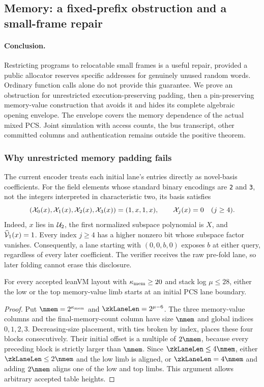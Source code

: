 \subsection{Memory: a fixed-prefix obstruction and a small-frame repair}\label{note:zk-memory-frames}

\paragraph{Conclusion.} Restricting programs to relocatable small frames is a useful repair, provided a public allocator reserves specific addresses for genuinely unused random words. Ordinary function calls alone do not provide this guarantee. We prove an obstruction for unrestricted execution-preserving padding, then a pin-preserving memory-value construction that avoids it and hides its complete algebraic opening envelope. The envelope covers the memory dependence of the actual mixed PCS. Joint simulation with access counts, the bus transcript, other committed columns and authentication remains outside the positive theorem.

\subsubsection{Why unrestricted memory padding fails}

The current encoder treats each initial lane's entries directly as novel-basis coefficients. For the field elements whose standard binary encodings are \texttt{2} and \texttt{3}, not the integers interpreted in characteristic two, its basis satisfies
\[
 (\mathcal{X}_0(x),\mathcal{X}_1(x),\mathcal{X}_2(x),\mathcal{X}_3(x))=(1,x,1,x),
 \qquad \mathcal{X}_j(x)=0\quad(j\ge4).
\]
Indeed, $x$ lies in $\mathcal{U}_2$, the first normalized subspace polynomial is $X$, and $\widehat{\mathcal{V}}_{1}(x)=1$. Every index $j\ge4$ has a higher nonzero bit whose subspace factor vanishes. Consequently, a lane starting with $(0,0,b,0)$ exposes $b$ at either query, regardless of every later coefficient. The verifier receives the raw pre-fold lane, so later folding cannot erase this disclosure.

\begin{proposition}\label{prop:zk-memory-alignment}
For every accepted leanVM layout with $\kappa_{\mathrm{mem}}\ge20$ and stack log $\mu\le28$, either the low or the top memory-value limb starts at an initial PCS lane boundary.
\end{proposition}
\begin{proof}
Put $\nmem=2^{\kmem}$ and $\zkLaneLen=2^{\mu-6}$. The three memory-value columns and the final-memory-count column have size $\nmem$ and global indices $0,1,2,3$. Decreasing-size placement, with ties broken by index, places these four blocks consecutively. Their initial offset is a multiple of $2\nmem$, because every preceding block is strictly larger than $\nmem$. Since $\zkLaneLen\le4\nmem$, either $\zkLaneLen\le2\nmem$ and the low limb is aligned, or $\zkLaneLen=4\nmem$ and adding $2\nmem$ aligns one of the low and top limbs. This argument allows arbitrary accepted table heights.
\end{proof}

